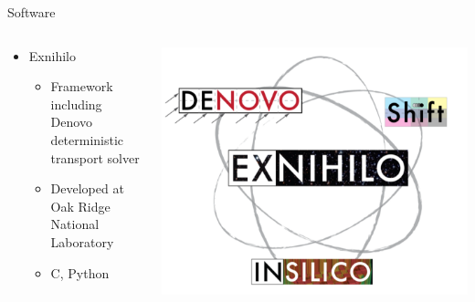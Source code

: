 \documentclass{beamer}
\newcommand{\cpp}{C\nolinebreak\hspace{-.05em}\raisebox{.4ex}{\tiny\bf +}\nolinebreak\hspace{-.10em}\raisebox{.4ex}{\tiny\bf +}}
\begin{document}
\begin{frame}{Software\nocite{exum,denovo}}
%
\begin{columns}
\begin{column}{0.5\textwidth}
\begin{itemize}
\item{Exnihilo}
\begin{itemize}
\item{Framework including Denovo deterministic transport solver}
\item{Developed at Oak Ridge National Laboratory}
\item{\cpp, Python}
\end{itemize}
\end{itemize}
\end{column}
%
\begin{column}{0.5\textwidth}
\includegraphics[width=\textwidth,natwidth=932,natheight=754]{img/exnihilo.png}
\end{column}
\end{columns}
%
\end{frame}
\end{document}
